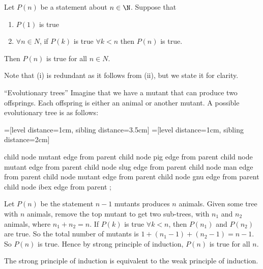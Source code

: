 \documentclass[a4paper]{article}
\begin{document}
\begin{thm}
  Let $P(n)$ be a statement about $n\in \N$. Suppose that
  \begin{enumerate}
    \item $P(1)$ is true
    \item $\forall n\in N$, if $P(k)$ is true $\forall k < n$ then $P(n)$ is true.
  \end{enumerate}
  Then $P(n)$ is true for all $n\in N$.
\end{thm}
Note that (i) is redundant as it follows from (ii), but we state it for clarity.

\begin{eg}
  ``Evolutionary trees'' Imagine that we have a mutant that can produce two offsprings. Each offspring is either an animal or another mutant. A possible evolutionary tree is as follows:

  =[level distance=1cm, sibling distance=3.5cm]
  =[level distance=1cm, sibling distance=2cm]
  \begin{center}
    \begin{tikz}
      child {
        node {mutant} edge from parent
        child {
          node {pig} edge from parent
        }
        child {
          node {mutant} edge from parent
          child {
            node {slug} edge from parent
          }
          child {
            node {man} edge from parent
          }
        }
      }
      child {
        node {mutant} edge from parent
        child {
          node {gnu} edge from parent
        }
        child {
          node {ibex} edge from parent
        }
      };
    \end{tikz}
  \end{center}
  Let $P(n)$ be the statement $n - 1$ mutants produces $n$ animals. Given some tree with $n$ animals, remove the top mutant to get two sub-trees, with $n_1$ and $n_2$ animals, where $n_1 + n_2 = n$. If $P(k)$ is true $\forall k < n$, then $P(n_1)$ and $P(n_2)$ are true. So the total number of mutants is $1 + (n_1 - 1) + (n_2 - 1) = n - 1$. So $P(n)$ is true. Hence by strong principle of induction, $P(n)$ is true for all $n$.
\end{eg}

\begin{thm}
  The strong principle of induction is equivalent to the weak principle of induction.
\end{thm}
\end{document}
